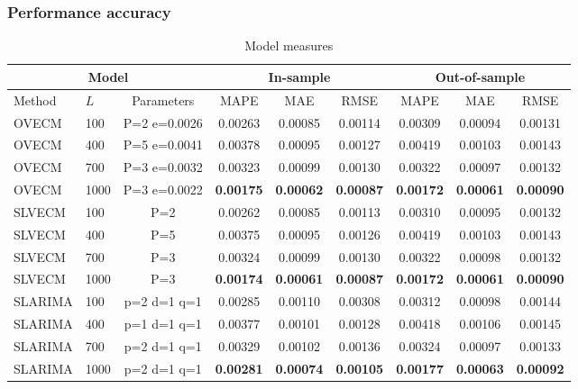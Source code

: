 \documentclass{beamer}
\begin{document}
\begin{frame}
\frametitle{Performance accuracy}
\tiny
\begin{table}[H]
\caption{Model measures}
\label{tab:stats}
\begin{center}
\begin{tabular}{|l|l|c|c|c|c|c|c|c|}
\hline
\multicolumn{3}{|c|}{Model} & \multicolumn{3}{|c|}{In-sample} &
\multicolumn{3}{|c|}{Out-of-sample} \\ 
\hline
\hline
Method & $L$ & Parameters &  
MAPE & MAE& RMSE& 
MAPE & MAE& RMSE \\
\hline
 OVECM  &   100  &  P=2 e=0.0026 &  0.00263&  0.00085&  0.00114&  0.00309&  0.00094&  0.00131\\
 OVECM  &   400  &  P=5 e=0.0041&  0.00378&  0.00095&  0.00127&  0.00419&  0.00103&  0.00143\\
 OVECM  &   700  &  P=3 e=0.0032&  0.00323&  0.00099&  0.00130&  0.00322&  0.00097&  0.00132\\
 OVECM  &   1000 &  P=3 e=0.0022&  
 \textbf{0.00175}&  \textbf{0.00062}&  \textbf{0.00087} &  
 \textbf{0.00172}&  \textbf{0.00061}&  \textbf{0.00090}\\
\hline
 SLVECM  &   100 &  P=2 &  0.00262&  0.00085&  0.00113&  0.00310&  0.00095&  0.00132\\
 SLVECM  &   400 &  P=5 &  0.00375&  0.00095&  0.00126&  0.00419&  0.00103&  0.00143\\
 SLVECM  &   700 &  P=3 &  0.00324&  0.00099&  0.00130&  0.00322&  0.00098&  0.00132\\
 SLVECM  &   1000&  P=3 &  
 \textbf{0.00174}&  \textbf{0.00061}&  \textbf{0.00087}&  
 \textbf{0.00172}&  \textbf{0.00061}&  \textbf{0.00090}\\
\hline
SLARIMA & 100  &p=2 d=1 q=1 & 0.00285  &  0.00110  &  0.00308  &  0.00312  &0.00098  &  0.00144 \\
SLARIMA & 400  &p=1 d=1 q=1 & 0.00377  &  0.00101  &  0.00128  &  0.00418 & 0.00106 & 0.00145 \\
SLARIMA & 700  &p=2 d=1 q=1 & 0.00329  &  0.00102  &  0.00136  &  0.00324  & 0.00097  &  0.00133 \\
SLARIMA & 1000 &p=2 d=1 q=1 & \textbf{0.00281}  & \textbf{0.00074}  &  \textbf{0.00105}  &  \textbf{0.00177} & \textbf{0.00063}  &  \textbf{0.00092} \\
\hline
\end{tabular}
\end{center}
\end{table}
\end{frame}
\end{document}
